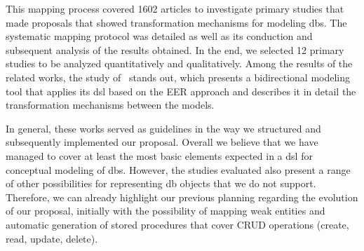 This mapping process covered 1602 articles to investigate primary studies that made proposals that showed transformation mechanisms for modeling \acp{db}.
The systematic mapping protocol was detailed as well as its conduction and subsequent analysis of the results obtained.
In the end, we selected 12 primary studies to be analyzed quantitatively and qualitatively.
Among the results of the related works, the study of~ stands out, which presents a bidirectional modeling tool that applies its \ac{dsl} based on the EER approach and describes it in detail the transformation mechanisms between the models.

In general, these works served as guidelines in the way we structured and subsequently implemented our proposal.
Overall we believe that we have managed to cover at least the most basic elements expected in a \ac{dsl} for conceptual modeling of \acp{db}.
However, the studies evaluated also present a range of other possibilities for representing \ac{db} objects that we do not support.
Therefore, we can already highlight our previous planning regarding the evolution of our proposal, initially with the possibility of mapping weak entities and automatic generation of stored procedures that cover CRUD operations (create, read, update, delete).